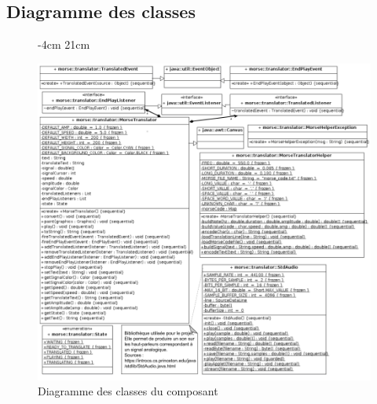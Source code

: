 \documentclass[a4paper,11pt]{article}
\begin{document}
    \subsection{Diagramme des classes}
    \begin{figure}[H]
         -4cm 21cm
        \begin{center}
            \includegraphics[scale=0.58]{classdiag.png}
            \caption{Diagramme des classes du composant}
            \label{Diagramme des classes du composant}
        \end{center}
    \end{figure}
\end{document}
